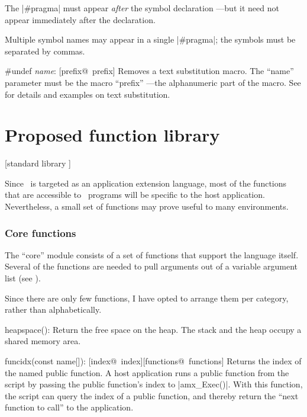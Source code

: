                 The |#pragma| must appear {\it after\/} the symbol declaration
                ---but it need not appear immediately after the declaration.

                Multiple symbol names may appear in a single |#pragma|; the
                symbols must be separated by commas.
        \endlist

\item \#undef {\it name\/}:
         [prefix@\midtilde\ prefix]
        Removes a text substitution macro. The ``name'' parameter must be the
        macro ``prefix'' ---the alphanumeric part of the macro.
        See  for details and examples on text substitution.
\endlist
{}


\vfill\eject
{}%

\chapter{Proposed function library}
  [standard library \midtilde]

%
Since \Small\ is targeted as an application extension language, most of the
functions that are accessible to \Small\ programs will be specific to the host
application. Nevertheless, a small set of functions may prove useful to many
environments.

\subsection{Core functions}
The ``core'' module consists of a set of functions that support the language
itself. Several of the functions are needed to pull arguments out of a variable
argument list (see ).

Since there are only few functions, I have opted to arrange them per category,
rather than alphabetically.

\beginlist{35pt}
\item heapspace():
  Return the free space on the heap. The stack and the heap occupy a shared
  memory area.
\item funcidx(const name[]):
  [index@\midtilde\ index][functions@\midtilde\ functions]
  Returns the index of the named public function.
  A host application runs a public function from the script by passing the public
  function's index to |amx_Exec()|. With this function, the script can query
  the index of a public function, and thereby return the ``next function to
  call'' to the application.

